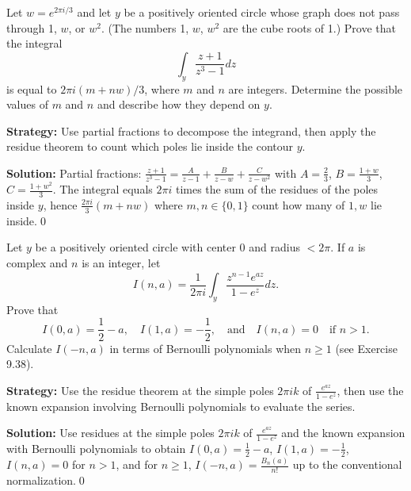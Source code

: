 \begin{problembox}
\begin{problemstatement}
Let \( w = e^{2\pi i / 3} \) and let \( y \) be a positively oriented circle whose graph does not pass through 1, \( w \), or \( w^2 \). (The numbers 1, \( w \), \( w^2 \) are the cube roots of 1.) Prove that the integral
\[ \int_y \frac{z + 1}{z^3 - 1} dz \]
is equal to \( 2\pi i (m + n w) / 3 \), where \( m \) and \( n \) are integers. Determine the possible values of \( m \) and \( n \) and describe how they depend on \( y \).
\end{problemstatement}
\end{problembox}

\noindent\textbf{Strategy:} Use partial fractions to decompose the integrand, then apply the residue theorem to count which poles lie inside the contour \( y \).

\bigskip\noindent\textbf{Solution:}
Partial fractions: $\frac{z+1}{z^3-1}=\frac{A}{z-1}+\frac{B}{z-w}+\frac{C}{z-w^2}$ with $A=\tfrac{2}{3}$, $B=\tfrac{1+w}{3}$, $C=\tfrac{1+w^2}{3}$. The integral equals $2\pi i$ times the sum of the residues of the poles inside $y$, hence $\frac{2\pi i}{3}(m+n w)$ where $m,n\in\{0,1\}$ count how many of $1,w$ lie inside.\qed


\begin{problembox}
\begin{problemstatement}
Let \( y \) be a positively oriented circle with center 0 and radius \( < 2\pi \). If \( a \) is complex and \( n \) is an integer, let
\[ I(n, a) = \frac{1}{2\pi i} \int_y \frac{z^{n-1} e^{az}}{1 - e^z} dz. \]
Prove that
\[ I(0, a) = \frac{1}{2} - a, \quad I(1, a) = -\frac{1}{2}, \quad \text{and} \quad I(n, a) = 0 \quad \text{if } n > 1. \]
Calculate \( I(-n, a) \) in terms of Bernoulli polynomials when \( n \geq 1 \) (see Exercise 9.38).
\end{problemstatement}
\end{problembox}

\noindent\textbf{Strategy:} Use the residue theorem at the simple poles \( 2\pi i k \) of \( \frac{e^{az}}{1-e^z} \), then use the known expansion involving Bernoulli polynomials to evaluate the series.

\bigskip\noindent\textbf{Solution:}
Use residues at the simple poles $2\pi i k$ of $\frac{e^{az}}{1-e^z}$ and the known expansion with Bernoulli polynomials to obtain $I(0,a)=\tfrac12-a$, $I(1,a)=-\tfrac12$, $I(n,a)=0$ for $n>1$, and for $n\ge1$, $I(-n,a)=\tfrac{B_n(a)}{n!}$ up to the conventional normalization.\qed


